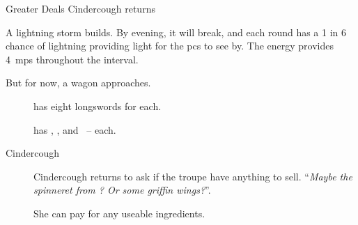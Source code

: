 \documentclass[10pt,twoside]{book}
\begin{document}
{Greater Deals}%
{Cindercough returns}%

A lightning storm builds.
By evening, it will break, and each \gls{round} has a 1 in 6 chance of lightning providing light for the \glspl{pc} to see by.
The energy provides 4~\glspl{mp} throughout the \gls{interval}.

But for now, a wagon approaches.

\begin{description}
  \item[\composeHumanName]
  has eight longswords for  each.
  \item[\composeHumanName]
  has \rations, \rations, and \rations\ --  each.
  \item[Cindercough]
  Cindercough returns to ask if the troupe have anything to sell.
  ``\textit{Maybe the spinneret from ?  Or some \gls{griffin} wings?}''.

  She can pay  for any useable \glspl{ingredient}.
\end{description}
\end{document}
